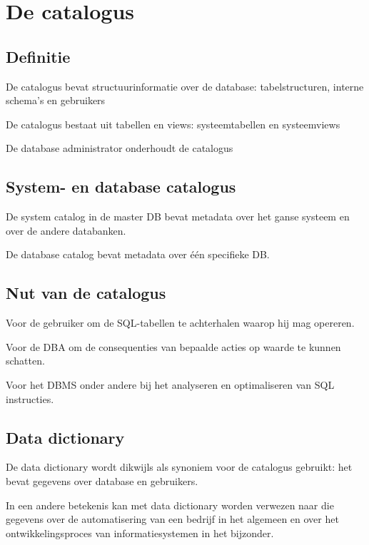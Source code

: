 \documentclass[a4paper,12pt]{article}
\begin{document}
\section{De catalogus}
\subsection{Definitie}
De catalogus bevat structuurinformatie over de database: tabelstructuren, interne schema's en gebruikers

De catalogus bestaat uit tabellen en views: systeemtabellen en systeemviews

De database administrator onderhoudt de catalogus

\subsection{System- en database catalogus}
De system catalog in de master DB bevat metadata over het ganse systeem en over de andere databanken.

De database catalog bevat metadata over één specifieke DB.

\subsection{Nut van de catalogus}
Voor de gebruiker om de SQL-tabellen te achterhalen waarop hij mag opereren.

Voor de DBA om de consequenties van bepaalde acties op waarde te kunnen schatten.

Voor het DBMS onder andere bij het analyseren en optimaliseren van SQL instructies.

\subsection{Data dictionary}
De data dictionary wordt dikwijls als synoniem voor de catalogus gebruikt: het bevat gegevens over database en gebruikers.

In een andere betekenis kan met data dictionary worden verwezen naar die gegevens over de automatisering van een bedrijf in het algemeen en over het ontwikkelingsproces van informatiesystemen in het bijzonder.
\end{document}
